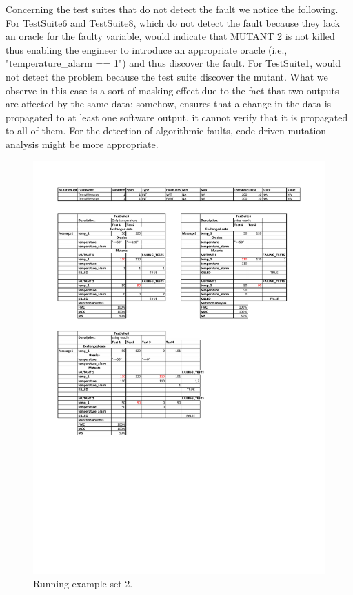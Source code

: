 Concerning the test suites that do not detect the fault we notice the following. For TestSuite6 and TestSuite8, which do not detect the fault because they lack an oracle for the faulty variable, \APPR would indicate that MUTANT 2 is not killed thus enabling the engineer to introduce an appropriate oracle (i.e., "temperature\_alarm == 1") and thus discover the fault. For TestSuite1, \APPR would not detect the problem because the test suite discover the mutant. What we observe in this case is a sort of masking effect due to the fact that two outputs are affected by the same data; somehow, \APPR ensures that a change in the data is propagated to at least one software output, it cannot verify that it is propagated to all of them. 
For the detection of algorithmic faults, code-driven mutation analysis might be more appropriate.

\begin{figure}[tb]
\centering
\includegraphics[width=14cm]{damat/DataDrivenExample2}
\caption{Running example set 2.}
\label{fig:damat:RunningExample2}
\end{figure}

